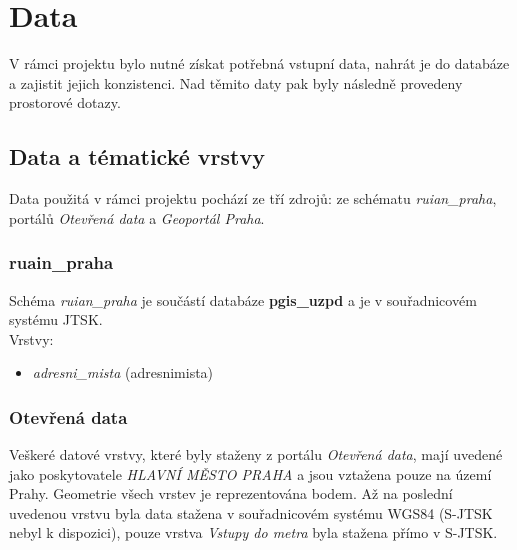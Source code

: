 \documentclass[a4paper, 12pt]{article}
\begin{document}
\section{Data}
V rámci projektu bylo nutné získat potřebná vstupní data, nahrát je do databáze a zajistit jejich konzistenci. Nad těmito daty pak byly následně provedeny prostorové dotazy.

\subsection{Data a tématické vrstvy}
Data použitá v rámci projektu pochází ze tří zdrojů: ze schématu \textit{ruian\_praha}, portálů \textit{Otevřená data} a \textit{Geoportál Praha}.

\subsubsection{ruain\_praha}
Schéma \textit{ruian\_praha} je součástí databáze \textbf{pgis\_uzpd} a je v souřadnicovém systému JTSK.\\

Vrstvy:
\begin{itemize}
\item \textsl{adresni\_mista} (adresnimista)
\end{itemize}

\subsubsection{Otevřená data}
Veškeré datové vrstvy, které byly staženy z portálu \textit{Otevřená data}, mají uvedené jako  pos\-ky\-tovatele \textsl{HLAVNÍ MĚSTO PRAHA} a jsou vztažena pouze na území Prahy. Geometrie všech vrstev je reprezentována bodem. Až na poslední uvedenou vrstvu byla data stažena v souřadnicovém systému WGS84 (S-JTSK nebyl k dispozici), pouze vrstva \textsl{Vstupy do metra} byla stažena přímo v S-JTSK.\\
\end{document}
